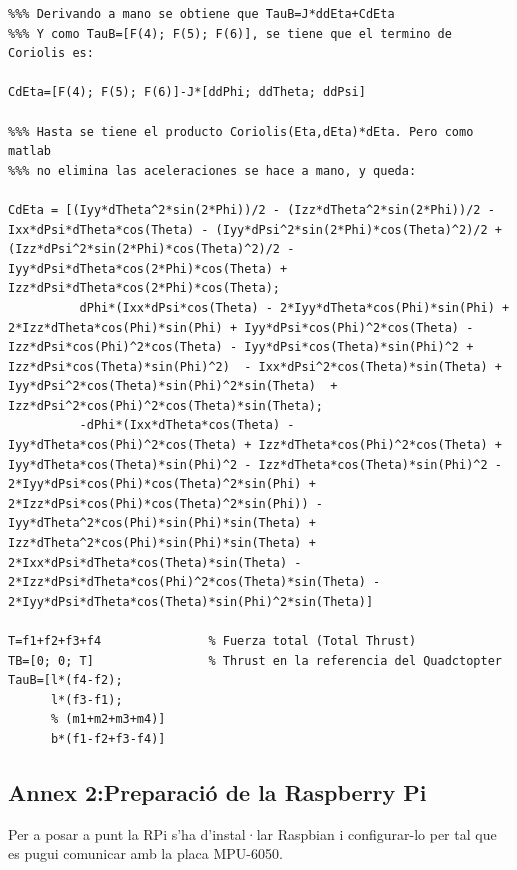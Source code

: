 \documentclass[twoside]{article}
\begin{document}
\begin{verbatim}
%%% Derivando a mano se obtiene que TauB=J*ddEta+CdEta 
%%% Y como TauB=[F(4); F(5); F(6)], se tiene que el termino de Coriolis es:

CdEta=[F(4); F(5); F(6)]-J*[ddPhi; ddTheta; ddPsi]

%%% Hasta se tiene el producto Coriolis(Eta,dEta)*dEta. Pero como matlab
%%% no elimina las aceleraciones se hace a mano, y queda:

CdEta = [(Iyy*dTheta^2*sin(2*Phi))/2 - (Izz*dTheta^2*sin(2*Phi))/2 - Ixx*dPsi*dTheta*cos(Theta) - (Iyy*dPsi^2*sin(2*Phi)*cos(Theta)^2)/2 + (Izz*dPsi^2*sin(2*Phi)*cos(Theta)^2)/2 - Iyy*dPsi*dTheta*cos(2*Phi)*cos(Theta) + Izz*dPsi*dTheta*cos(2*Phi)*cos(Theta);
          dPhi*(Ixx*dPsi*cos(Theta) - 2*Iyy*dTheta*cos(Phi)*sin(Phi) + 2*Izz*dTheta*cos(Phi)*sin(Phi) + Iyy*dPsi*cos(Phi)^2*cos(Theta) - Izz*dPsi*cos(Phi)^2*cos(Theta) - Iyy*dPsi*cos(Theta)*sin(Phi)^2 + Izz*dPsi*cos(Theta)*sin(Phi)^2)  - Ixx*dPsi^2*cos(Theta)*sin(Theta) + Iyy*dPsi^2*cos(Theta)*sin(Phi)^2*sin(Theta)  + Izz*dPsi^2*cos(Phi)^2*cos(Theta)*sin(Theta);
          -dPhi*(Ixx*dTheta*cos(Theta) - Iyy*dTheta*cos(Phi)^2*cos(Theta) + Izz*dTheta*cos(Phi)^2*cos(Theta) + Iyy*dTheta*cos(Theta)*sin(Phi)^2 - Izz*dTheta*cos(Theta)*sin(Phi)^2 - 2*Iyy*dPsi*cos(Phi)*cos(Theta)^2*sin(Phi) + 2*Izz*dPsi*cos(Phi)*cos(Theta)^2*sin(Phi)) - Iyy*dTheta^2*cos(Phi)*sin(Phi)*sin(Theta) + Izz*dTheta^2*cos(Phi)*sin(Phi)*sin(Theta) + 2*Ixx*dPsi*dTheta*cos(Theta)*sin(Theta) - 2*Izz*dPsi*dTheta*cos(Phi)^2*cos(Theta)*sin(Theta) - 2*Iyy*dPsi*dTheta*cos(Theta)*sin(Phi)^2*sin(Theta)]
      
T=f1+f2+f3+f4               % Fuerza total (Total Thrust)
TB=[0; 0; T]                % Thrust en la referencia del Quadctopter
TauB=[l*(f4-f2);
      l*(f3-f1);
      % (m1+m2+m3+m4)]
      b*(f1-f2+f3-f4)]
\end{verbatim}
\newpage



\subsection*{Annex 2:Preparació de la Raspberry Pi}
Per a posar a punt la RPi s'ha d'instal·lar Raspbian i configurar-lo per tal que es pugui comunicar amb la placa MPU-6050.
\end{document}

